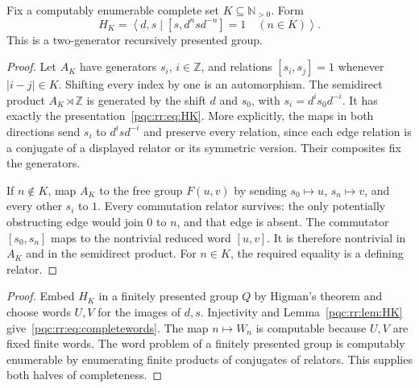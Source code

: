 \documentclass[11pt,letterpaper]{article}
\numberwithin{equation}{section}
\newtheorem{lemma}[theorem]{Lemma}
\newtheorem{corollary}[theorem]{Corollary}
\theoremstyle{definition}
\theoremstyle{remark}
\newcommand{\N}{\mathbb N}
\newcommand{\Z}{\mathbb Z}
\newcommand{\pair}[1]{\left\langle #1\right\rangle}
\newcommand{\abs}[1]{\left\lvert#1\right\rvert}
\begin{document}
Fix a computably enumerable complete set $K\subseteq\N_{>0}$. Form
\begin{equation}\label{pqc:rr:eq:HK}
 H_K=\pair{d,s\mid [s,d^n s d^{-n}]=1\quad(n\in K)}.
\end{equation}
This is a two-generator recursively presented group.

\begin{proof}
Let $A_K$ have generators $s_i$, $i\in\Z$, and relations
$[s_i,s_j]=1$ whenever $\abs{i-j}\in K$. Shifting every index by one is
an automorphism. The semidirect product $A_K\rtimes\Z$ is generated by
the shift $d$ and $s_0$, with $s_i=d^is_0d^{-i}$. It has exactly the
presentation~\eqref{pqc:rr:eq:HK}. More explicitly, the maps in both directions
send $s_i$ to $d^isd^{-i}$ and preserve every relation, since each edge
relation is a conjugate of a displayed relator or its symmetric version.
Their composites fix the generators.

If $n\notin K$, map $A_K$ to the free group $F(u,v)$ by sending
$s_0\mapsto u$, $s_n\mapsto v$, and every other $s_i$ to $1$. Every
commutation relator survives: the only potentially obstructing edge
would join $0$ to $n$, and that edge is absent. The commutator
$[s_0,s_n]$ maps to the nontrivial reduced word $[u,v]$. It is therefore
nontrivial in $A_K$ and in the semidirect product. For $n\in K$, the
required equality is a defining relator.
\end{proof}

\begin{proof}
Embed $H_K$ in a finitely presented group $Q$ by Higman's theorem and
choose words $U,V$ for the images of $d,s$. Injectivity and
Lemma~\ref{pqc:rr:lem:HK} give~\eqref{pqc:rr:eq:completewords}. The map $n\mapsto W_n$
is computable because $U,V$ are fixed finite words. The word problem of
a finitely presented group is computably enumerable by enumerating finite
products of conjugates of relators. This supplies both halves of
completeness.
\end{proof}
\end{document}
